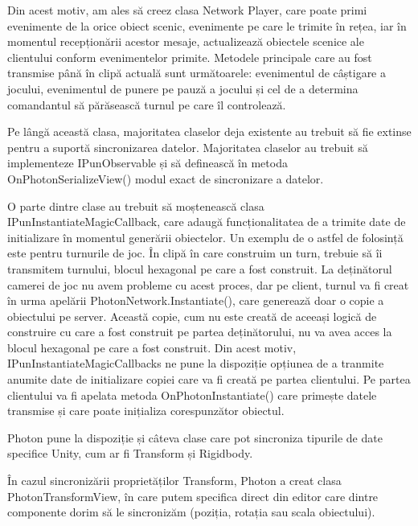 \documentclass[12pt, a4paper]{article}
\begin{document}
	Din acest motiv, am ales să creez clasa Network Player, care poate primi evenimente de la orice obiect scenic, evenimente pe care le trimite în rețea, iar în momentul recepționării acestor mesaje, actualizează obiectele scenice ale clientului conform evenimentelor primite. Metodele principale care au fost transmise până în clipă actuală sunt următoarele: evenimentul de câștigare a jocului, evenimentul de punere pe pauză a jocului și cel de a determina comandantul să părăsească turnul pe care îl controlează.
	\newline
	
	Pe lângă această clasa, majoritatea claselor deja existente au trebuit să fie extinse pentru a suportă sincronizarea datelor. Majoritatea claselor au trebuit să implementeze IPunObservable și să definească în metoda OnPhotonSerializeView() modul exact de sincronizare a datelor.
	\newline
	
	O parte dintre clase au trebuit să moștenească clasa IPunInstantiateMagicCallback, care adaugă funcționalitatea de a trimite date de initializare în momentul generării obiectelor. Un exemplu de o astfel de folosință este pentru turnurile de joc. În clipă în care construim un turn, trebuie să îi transmitem turnului, blocul hexagonal pe care a fost construit. La deținătorul camerei de joc nu avem probleme cu acest proces, dar pe client, turnul va fi creat în urma apelării PhotonNetwork.Instantiate(), care generează doar o copie a obiectului pe server. Această copie, cum nu este creată de aceeași logică de construire cu care a fost construit pe partea deținătorului, nu va avea acces la blocul hexagonal pe care a fost construit. Din acest motiv, IPunInstantiateMagicCallbacks ne pune la dispoziție opțiunea de a tranmite anumite date de initializare copiei care va fi creată pe partea clientului. Pe partea clientului va fi apelata metoda OnPhotonInstantiate() care primește datele transmise și care poate inițializa corespunzător obiectul.
	\newline
	
	Photon pune la dispoziție și câteva clase care pot sincroniza tipurile de date specifice Unity, cum ar fi Transform și Rigidbody. 
	\newline
	
	În cazul sincronizării proprietăților Transform, Photon a creat clasa PhotonTransformView, în care putem specifica direct din editor care dintre componente dorim să le sincronizăm (poziția, rotația sau scala obiectului). 
	\newline
	
\end{document}
